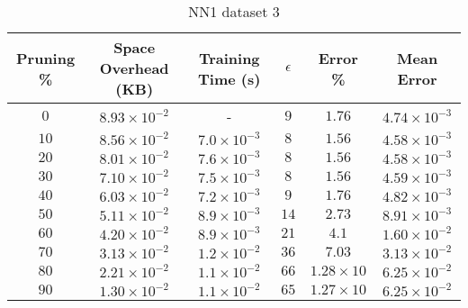 \begin{adjustwidth}{0cm}{}
\begin{table}
\caption{NN1 dataset 3}\label{pr13}
\begin{tabular}{cccccc}
\hline
\toprule
Pruning \% & Space Overhead (KB) & Training Time (s) & $\epsilon$ & Error \% & Mean Error\\
\midrule
$0$ & $8.93 \times 10^{-2}$ & - & $9$ & $1.76$ & $4.74 \times 10^{-3}$\\
$10$ & $8.56 \times 10^{-2}$ & $7.0 \times 10^{-3}$ & $8$ & $1.56$ & $4.58 \times 10^{-3}$\\
$20$ & $8.01 \times 10^{-2}$ & $7.6 \times 10^{-3}$ & $8$ & $1.56$ & $4.58 \times 10^{-3}$\\
$30$ & $7.10 \times 10^{-2}$ & $7.5 \times 10^{-3}$ & $8$ & $1.56$ & $4.59 \times 10^{-3}$\\
$40$ & $6.03 \times 10^{-2}$ & $7.2 \times 10^{-3}$ & $9$ & $1.76$ & $4.82 \times 10^{-3}$\\
$50$ & $5.11 \times 10^{-2}$ & $8.9 \times 10^{-3}$ & $14$ & $2.73$ & $8.91 \times 10^{-3}$\\
$60$ & $4.20 \times 10^{-2}$ & $8.9 \times 10^{-3}$ & $21$ & $4.1$ & $1.60 \times 10^{-2}$\\
$70$ & $3.13 \times 10^{-2}$ & $1.2 \times 10^{-2}$ & $36$ & $7.03$ & $3.13 \times 10^{-2}$\\
$80$ & $2.21 \times 10^{-2}$ & $1.1 \times 10^{-2}$ & $66$ & $1.28 \times 10$ & $6.25 \times 10^{-2}$\\
$90$ & $1.30 \times 10^{-2}$ & $1.1 \times 10^{-2}$ & $65$ & $1.27 \times 10$ & $6.25 \times 10^{-2}$\\
\bottomrule
\end{tabular}
\end{table}
\end{adjustwidth}

\par\null\par

